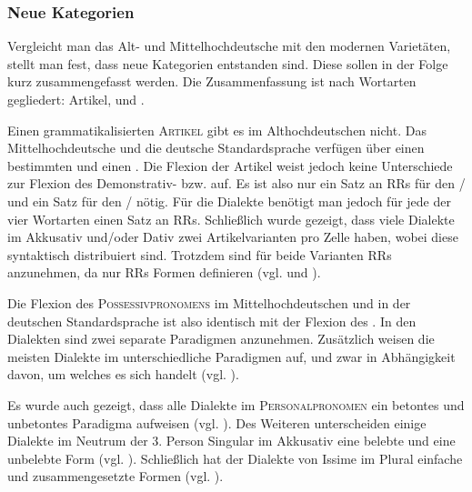 \subsubsection{Neue Kategorien}\label{5.7.3.6}

Vergleicht man das Alt- und Mittelhochdeutsche mit den modernen Varietäten, stellt man fest, dass neue Kategorien entstanden sind. Diese sollen in der Folge kurz zusammengefasst werden. Die Zusammenfassung ist nach Wortarten gegliedert: Artikel,  und .

Einen grammatikalisierten \textsc{Artikel} gibt es im Althochdeutschen nicht. Das Mittelhochdeutsche und die deutsche Standardsprache verfügen über einen bestimmten und einen . Die Flexion der Artikel weist jedoch keine Unterschiede zur Flexion des Demonstrativ- bzw.  auf. Es ist also nur ein Satz an RRs für den / und ein Satz für den / nötig. Für die Dialekte benötigt man jedoch für jede der vier Wortarten einen Satz an RRs. Schließlich wurde gezeigt, dass viele Dialekte im Akkusativ und/oder Dativ zwei Artikelvarianten pro Zelle haben, wobei diese syntaktisch distribuiert sind. Trotzdem sind für beide Varianten RRs anzunehmen, da nur RRs Formen definieren (vgl.  und ).

Die Flexion des \textsc{Possessivpronomens} im Mittelhochdeutschen und in der deutschen Standardsprache ist also identisch mit der Flexion des . In den Dialekten sind zwei separate Paradigmen anzunehmen. Zusätzlich weisen die meisten Dialekte im  unterschiedliche Paradigmen auf, und zwar in Abhängigkeit davon, um welches  es sich handelt (vgl. ).

Es wurde auch gezeigt, dass alle Dialekte im \textsc{Personalpronomen} ein betontes und unbetontes Paradigma aufweisen (vgl. ). Des Weiteren unterscheiden einige Dialekte im Neutrum der 3. Person Singular im Akkusativ eine belebte und eine unbelebte Form (vgl. ). Schließlich hat der Dialekte von Issime im Plural einfache und zusammengesetzte Formen (vgl. ).